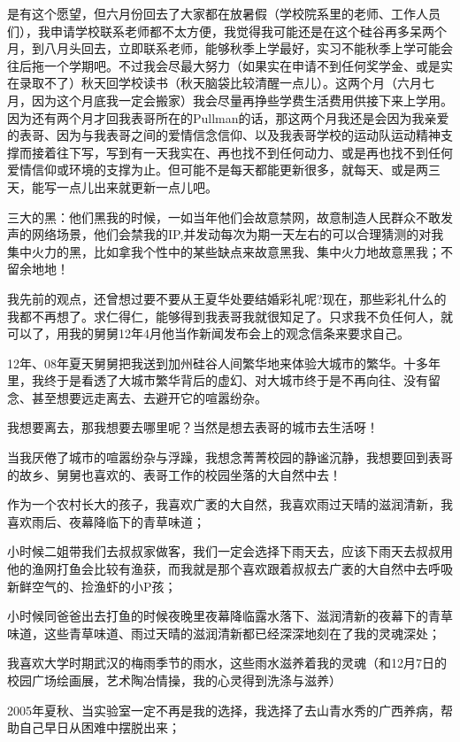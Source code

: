 \documentclass[9pt, b5paper]{article}
\begin{document}
是有这个愿望，但六月份回去了大家都在放暑假（学校院系里的老师、工作人员们），我申请学校联系老师都不太方便，我觉得我可能还是在这个硅谷再多呆两个月，到八月头回去，立即联系老师，能够秋季上学最好，实习不能秋季上学可能会往后拖一个学期吧。不过我会尽最大努力（如果实在申请不到任何奖学金、或是实在录取不了）秋天回学校读书（秋天脑袋比较清醒一点儿）。这两个月（六月七月，因为这个月底我一定会搬家）我会尽量再挣些学费生活费用供接下来上学用。因为还有两个月才回我表哥所在的Pullman的话，那这两个月我还是会因为我亲爱的表哥、因为与我表哥之间的爱情信念信仰、以及我表哥学校的运动队运动精神支撑而接着往下写，写到有一天我实在、再也找不到任何动力、或是再也找不到任何爱情信仰或环境的支撑为止。但可能不是每天都能更新很多，就每天、或是两三天，能写一点儿出来就更新一点儿吧。

三大的黑：他们黑我的时候，一如当年他们会故意禁网，故意制造人民群众不敢发声的网络场景，他们会禁我的IP,并发动每次为期一天左右的可以合理猜测的对我集中火力的黑，比如拿我个性中的某些缺点来故意黑我、集中火力地故意黑我；不留余地地！

我先前的观点，还曾想过要不要从王夏华处要结婚彩礼呢?现在，那些彩礼什么的我都不再想了。求仁得仁，能够得到我表哥我就很知足了。只求我不负任何人，就可以了，用我的舅舅12年4月他当作新闻发布会上的观念信条来要求自己。

12年、08年夏天舅舅把我送到加州硅谷人间繁华地来体验大城市的繁华。十多年里，我终于是看透了大城市繁华背后的虚幻、对大城市终于是不再向往、没有留念、甚至想要远走离去、去避开它的喧嚣纷杂。

我想要离去，那我想要去哪里呢？当然是想去表哥的城市去生活呀！

当我厌倦了城市的喧嚣纷杂与浮躁，我想念菁菁校园的静谧沉静，我想要回到表哥的故乡、舅舅也喜欢的、表哥工作的校园坐落的大自然中去！

作为一个农村长大的孩子，我喜欢广袤的大自然，我喜欢雨过天晴的滋润清新，我喜欢雨后、夜幕降临下的青草味道；

小时候二姐带我们去叔叔家做客，我们一定会选择下雨天去，应该下雨天去叔叔用他的渔网打鱼会比较有渔获，而我就是那个喜欢跟着叔叔去广袤的大自然中去呼吸新鲜空气的、捡渔虾的小P孩；

小时候同爸爸出去打鱼的时候夜晚里夜幕降临露水落下、滋润清新的夜幕下的青草味道，这些青草味道、雨过天晴的滋润清新都已经深深地刻在了我的灵魂深处；

我喜欢大学时期武汉的梅雨季节的雨水，这些雨水滋养着我的灵魂（和12月7日的校园广场绘画展，艺术陶冶情操，我的心灵得到洗涤与滋养）

2005年夏秋、当实验室一定不再是我的选择，我选择了去山青水秀的广西养病，帮助自己早日从困难中摆脱出来；
\end{document}
